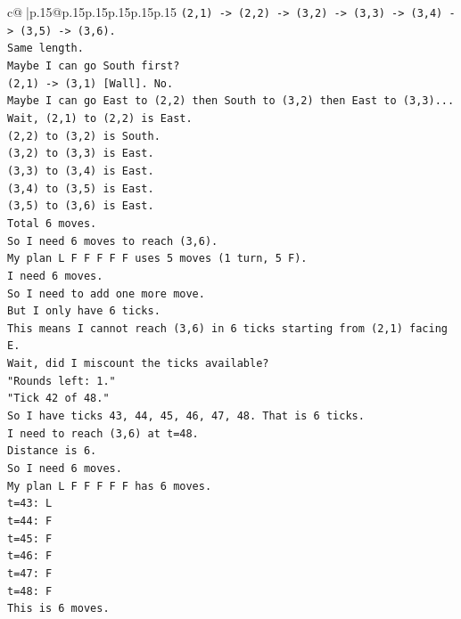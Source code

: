 \documentclass{article}
\begin{document}
{\begin{supertabular}{c@{$\;$}|p{.15\linewidth}@{}p{.15\linewidth}p{.15\linewidth}p{.15\linewidth}p{.15\linewidth}p{.15\linewidth}}
{{{\texttt{(2,1) {-}> (2,2) {-}> (3,2) {-}> (3,3) {-}> (3,4) {-}> (3,5) {-}> (3,6).} \\
\texttt{Same length.} \\
\texttt{Maybe I can go South first?} \\
\texttt{(2,1) {-}> (3,1) {[}Wall{]}. No.} \\
\texttt{Maybe I can go East to (2,2) then South to (3,2) then East to (3,3)...} \\
\texttt{Wait, (2,1) to (2,2) is East.} \\
\texttt{(2,2) to (3,2) is South.} \\
\texttt{(3,2) to (3,3) is East.} \\
\texttt{(3,3) to (3,4) is East.} \\
\texttt{(3,4) to (3,5) is East.} \\
\texttt{(3,5) to (3,6) is East.} \\
\texttt{Total 6 moves.} \\
\texttt{So I need 6 moves to reach (3,6).} \\
\texttt{My plan L F F F F F uses 5 moves (1 turn, 5 F).} \\
\texttt{I need 6 moves.} \\
\texttt{So I need to add one more move.} \\
\texttt{But I only have 6 ticks.} \\
\texttt{This means I cannot reach (3,6) in 6 ticks starting from (2,1) facing E.} \\
\texttt{Wait, did I miscount the ticks available?} \\
\texttt{"Rounds left: 1."} \\
\texttt{"Tick 42 of 48."} \\
\texttt{So I have ticks 43, 44, 45, 46, 47, 48. That is 6 ticks.} \\
\texttt{I need to reach (3,6) at t=48.} \\
\texttt{Distance is 6.} \\
\texttt{So I need 6 moves.} \\
\texttt{My plan L F F F F F has 6 moves.} \\
\texttt{t=43: L} \\
\texttt{t=44: F} \\
\texttt{t=45: F} \\
\texttt{t=46: F} \\
\texttt{t=47: F} \\
\texttt{t=48: F} \\
\texttt{This is 6 moves.} \\
}}}
\end{supertabular}}
\end{document}
